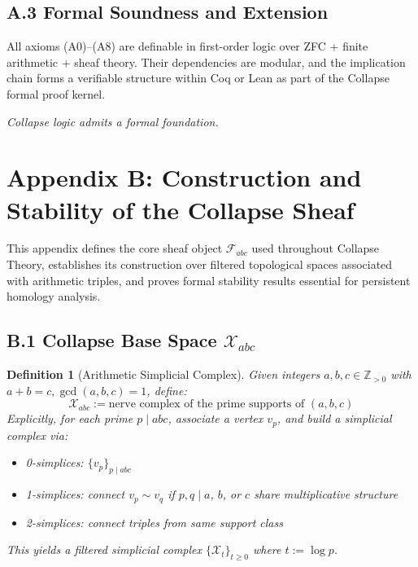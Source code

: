 \documentclass[11pt]{article}
\newtheorem{definition}[theorem]{Definition}
\begin{document}
\subsection*{A.3 Formal Soundness and Extension}

All axioms (A0)–(A8) are definable in first-order logic over ZFC + finite arithmetic + sheaf theory.  
Their dependencies are modular, and the implication chain forms a verifiable structure within Coq or Lean  
as part of the Collapse formal proof kernel.

\begin{center}
    \textit{Collapse logic admits a formal foundation.}
\end{center}



\section*{Appendix B: Construction and Stability of the Collapse Sheaf}

This appendix defines the core sheaf object \( \mathcal{F}_{abc} \) used throughout Collapse Theory,  
establishes its construction over filtered topological spaces associated with arithmetic triples,  
and proves formal stability results essential for persistent homology analysis.

\subsection*{B.1 Collapse Base Space \( \mathcal{X}_{abc} \)}

\begin{definition}[Arithmetic Simplicial Complex]
Given integers \( a, b, c \in \mathbb{Z}_{>0} \) with \( a + b = c, \gcd(a,b,c)=1 \), define:
\[
\mathcal{X}_{abc} := \text{nerve complex of the prime supports of } (a,b,c)
\]
Explicitly, for each prime \( p \mid abc \), associate a vertex \( v_p \), and build a simplicial complex via:
\begin{itemize}
  \item 0-simplices: \( \{ v_p \}_{p \mid abc} \)
  \item 1-simplices: connect \( v_p \sim v_q \) if \( p,q \mid a \), \( b \), or \( c \) share multiplicative structure
  \item 2-simplices: connect triples from same support class
\end{itemize}
This yields a filtered simplicial complex \( \{ \mathcal{X}_t \}_{t \geq 0} \) where \( t := \log p \).
\end{definition}
\end{document}
